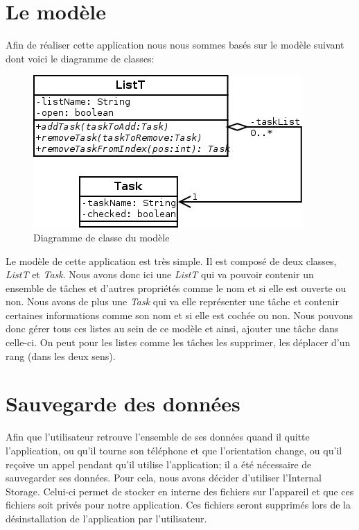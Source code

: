 \documentclass[a4paper,10pt]{article}
\begin{document}
\newpage
\section{Le modèle}
Afin de réaliser cette application nous nous sommes basés sur le modèle suivant dont voici le diagramme de classes:
\begin{figure}[htpb]
	\center
	\includegraphics[scale=0.5]{Images/dia_classe.png}
	\caption{Diagramme de classe du modèle}
\end{figure}

Le modèle de cette application est très simple. Il est composé de deux classes, \textit{ListT} et \textit{Task}.
Nous avons donc ici une \textit{ListT} qui va pouvoir contenir un ensemble de tâches et d'autres propriétés comme le nom et si elle est ouverte ou non. Nous avons de plus une \textit{Task} qui va elle représenter une tâche et contenir certaines informations comme son nom et si elle est cochée ou non.
Nous pouvons donc gérer tous ces listes au sein de ce modèle et ainsi, ajouter une tâche dans celle-ci. On peut pour les listes comme les tâches les supprimer, les déplacer d'un rang (dans les deux sens).

\newpage
\section{Sauvegarde des données}
Afin que l'utilisateur retrouve l'ensemble de ses données quand il quitte l'application, ou qu'il tourne son téléphone et que l'orientation change, ou qu'il reçoive un appel pendant qu'il utilise l'application; il a été nécessaire de sauvegarder ses données. Pour cela, nous avons décider d'utiliser l'Internal Storage. Celui-ci permet de stocker en interne des fichiers sur l'appareil et que ces fichiers soit privés pour notre application. Ces fichiers seront supprimés lors de la désinstallation de l'application par l'utilisateur.
\end{document}
